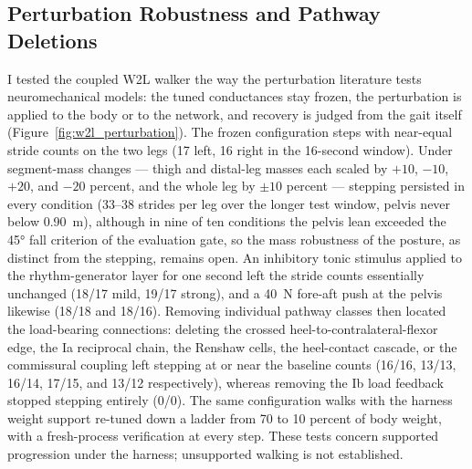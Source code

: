 \subsection{Perturbation Robustness and Pathway Deletions}\label{sec:w2l_perturbation}

I tested the coupled W2L walker the way the perturbation literature tests neuromechanical models: the tuned conductances stay frozen, the perturbation is applied to the body or to the network, and recovery is judged from the gait itself (Figure~\ref{fig:w2l_perturbation}). The frozen configuration steps with near-equal stride counts on the two legs (17 left, 16 right in the 16-second window). Under segment-mass changes --- thigh and distal-leg masses each scaled by $+10$, $-10$, $+20$, and $-20$ percent, and the whole leg by $\pm 10$ percent --- stepping persisted in every condition (33--38 strides per leg over the longer test window, pelvis never below \qty{0.90}{\meter}), although in nine of ten conditions the pelvis lean exceeded the \ang{45} fall criterion of the evaluation gate, so the mass robustness of the posture, as distinct from the stepping, remains open. An inhibitory tonic stimulus applied to the rhythm-generator layer for one second left the stride counts essentially unchanged (18/17 mild, 19/17 strong), and a \qty{40}{\newton} fore-aft push at the pelvis likewise (18/18 and 18/16). Removing individual pathway classes then located the load-bearing connections: deleting the crossed heel-to-contralateral-flexor edge, the Ia reciprocal chain, the Renshaw cells, the heel-contact cascade, or the commissural coupling left stepping at or near the baseline counts (16/16, 13/13, 16/14, 17/15, and 13/12 respectively), whereas removing the Ib load feedback stopped stepping entirely (0/0). The same configuration walks with the harness weight support re-tuned down a ladder from 70 to 10 percent of body weight, with a fresh-process verification at every step. These tests concern supported progression under the harness; unsupported walking is not established.

